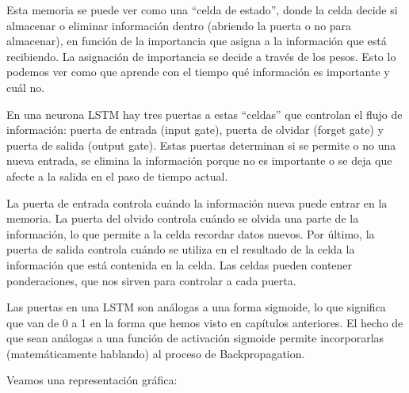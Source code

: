 \documentclass[
  a4paper,
  DIV=11,
  numbers=noendperiod]{scrreprt}
\begin{document}
Esta memoria se puede ver como una ``celda de estado'', donde la celda
decide si almacenar o eliminar información dentro (abriendo la puerta o
no para almacenar), en función de la importancia que asigna a la
información que está recibiendo. La asignación de importancia se decide
a través de los pesos. Esto lo podemos ver como que aprende con el
tiempo qué información es importante y cuál no.

En una neurona LSTM hay tres puertas a estas ``celdas'' que controlan el
flujo de información: puerta de entrada (input gate), puerta de olvidar
(forget gate) y puerta de salida (output gate). Estas puertas determinan
si se permite o no una nueva entrada, se elimina la información porque
no es importante o se deja que afecte a la salida en el paso de tiempo
actual.

La puerta de entrada controla cuándo la información nueva puede entrar
en la memoria. La puerta del olvido controla cuándo se olvida una parte
de la información, lo que permite a la celda recordar datos nuevos. Por
último, la puerta de salida controla cuándo se utiliza en el resultado
de la celda la información que está contenida en la celda. Las celdas
pueden contener ponderaciones, que nos sirven para controlar a cada
puerta.

Las puertas en una LSTM son análogas a una forma sigmoide, lo que
significa que van de 0 a 1 en la forma que hemos visto en capítulos
anteriores. El hecho de que sean análogas a una función de activación
sigmoide permite incorporarlas (matemáticamente hablando) al proceso de
Backpropagation.

Veamos una representación gráfica:
\end{document}
